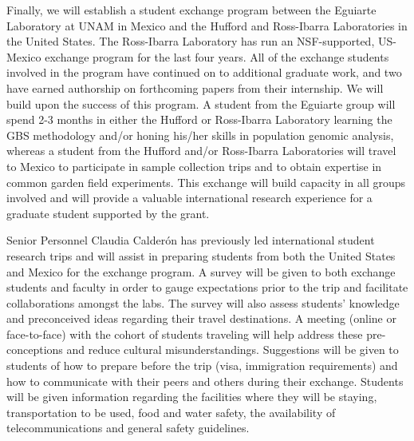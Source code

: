 Finally, we will establish a student exchange program between the Eguiarte Laboratory at UNAM in Mexico and the Hufford and Ross-Ibarra Laboratories in the United States. The Ross-Ibarra Laboratory has run an NSF-supported, US-Mexico exchange program for the last four years.  All of the exchange students involved in the program have continued on to additional graduate work, and two have earned authorship on forthcoming papers from their internship.  We will build upon the success of this program.  A student from the Eguiarte group will spend 2-3 months in either the Hufford or Ross-Ibarra Laboratory learning the GBS methodology and/or honing his/her skills in population genomic analysis, whereas a student from the Hufford and/or Ross-Ibarra Laboratories will travel to Mexico to participate in sample collection trips and to obtain expertise in common garden field experiments. This exchange will build capacity in all groups involved and will provide a valuable international research experience for a graduate student supported by the grant.  

Senior Personnel Claudia Calder\'{o}n has previously led international student research trips and will assist in preparing students from both the United States and Mexico for the exchange program. A survey will be given to both exchange students and faculty in order to gauge expectations prior to the trip and facilitate collaborations amongst the labs.  The survey will also assess students' knowledge and preconceived ideas  regarding their travel destinations.  A meeting (online or face-to-face) with the cohort of students traveling will help address these pre-conceptions and reduce cultural misunderstandings.  Suggestions will be given to students of how to prepare before the trip (visa, immigration requirements) and how to communicate with their peers and others during their exchange.  Students will be given information regarding the facilities where they will be staying, transportation to be used, food and water safety, the availability of telecommunications and general safety guidelines.



